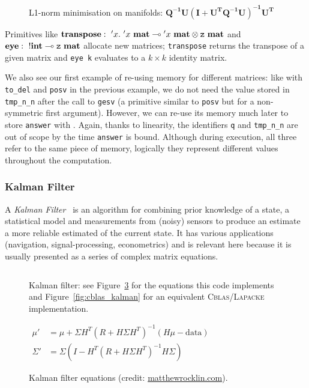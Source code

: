 \begin{figure}[t]
    \centering
    \inputminted[fontsize=\small]{ocaml}{../../examples/l1_norm_min.lt}
    \caption{L1-norm minimisation on manifolds:
        $\mathbf{Q^{-1}U(I+U^TQ^{-1}U)^{-1}U^T}$}\label{fig:lang_l1_norm_min}
\end{figure}

Primitives like $\ottkw{transpose}:\ {'x}.\ {{'x}\ \Mat}
\multimap {{'x}\ \Mat} \otimes {\Zf\ \Mat}$ and $\mathbf{eye}:\ {!\mathbf{int}}
\multimap {\texttt{z}\ \mathbf{mat}}$ allocate new matrices; \texttt{transpose} returns
the transpose of a given matrix and \texttt{eye k} evaluates to a $k \times k$
identity matrix.

We also see our first example of re-using memory for different matrices: like
with \texttt{to\_del} and \texttt{posv} in the previous example, we do not need
the value stored in \texttt{tmp\_n\_n} after the call to \texttt{gesv} (a
primitive similar to \texttt{posv} but for a non-symmetric first argument).
However, we can re-use its memory much later to store \texttt{answer} with
. Again, thanks to
linearity, the identifiers \texttt{q} and \texttt{tmp\_n\_n} are out of scope
by the time \texttt{answer} is bound. Although during execution, all three
refer to the same piece of memory, logically they represent different values
throughout the computation.

\subsubsection{Kalman Filter}

A \emph{Kalman Filter}~\cite{kalman} is an algorithm for combining prior
knowledge of a state, a statistical model and measurements from (noisy) sensors
to produce an estimate a more reliable estimated of the current state.  It has
various applications (navigation, signal-processing, econometrics) and is
relevant here because it is usually presented as a series of complex matrix
equations.

\begin{figure}[t]
    \centering
    \inputminted[fontsize=\small]{ocaml}{../../examples/kalman.lt}
    \caption{Kalman filter: see Figure~\ref{fig:kalman_eqns} for the
        equations this code implements and Figure~\ref{fig:cblas_kalman}
        for an equivalent \textsc{Cblas/Lapacke} implementation.}\label{fig:lang_kalman}
\end{figure}

\begin{figure}[t]
    {\centering
    $ \displaystyle
    \begin{aligned}
        \mu' &= \mu + \Sigma H^T (R + H \Sigma H^T)^{-1} (H \mu - \textrm{data})\\
        \Sigma' &= \Sigma ( I - H^T (R + H \Sigma H^T)^{-1} H \Sigma )
    \end{aligned}
    $ \par}
    \caption{Kalman filter equations (credit:
    \href{http://matthewrocklin.com/blog/work/2012/11/24/Kalman-Filter}{matthewrocklin.com}).}\label{fig:kalman_eqns}
\end{figure}

